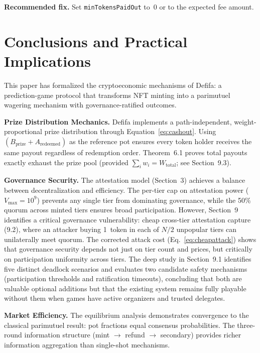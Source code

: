 \documentclass[11pt,a4paper]{article}
\begin{document}
\textbf{Recommended fix.} Set \texttt{minTokensPaidOut} to~0 or to the expected fee amount.

\section{Conclusions and Practical Implications}

This paper has formalized the cryptoeconomic mechanisms of Defifa: a prediction-game protocol that transforms NFT minting into a parimutuel wagering mechanism with governance-ratified outcomes.

\textbf{Prize Distribution Mechanics.} Defifa implements a path-independent, weight-proportional prize distribution through Equation~\ref{eq:cashout}. Using $(B_{\text{prize}} + A_{\text{redeemed}})$ as the reference pot ensures every token holder receives the same payout regardless of redemption order. Theorem~6.1 proves total payouts exactly exhaust the prize pool (provided $\sum_i w_i = W_{\text{total}}$; see Section~9.3).

\textbf{Governance Security.} The attestation model (Section~3) achieves a balance between decentralization and efficiency. The per-tier cap on attestation power ($V_{\text{max}} = 10^9$) prevents any single tier from dominating governance, while the 50\% quorum across minted tiers ensures broad participation. However, Section~9 identifies a critical governance vulnerability: cheap cross-tier attestation capture (9.2), where an attacker buying 1~token in each of $N/2$ unpopular tiers can unilaterally meet quorum. The corrected attack cost (Eq.~\ref{eq:cheapattack}) shows that governance security depends not just on tier count and prices, but critically on participation uniformity across tiers. The deep study in Section~9.1 identifies five distinct deadlock scenarios and evaluates two candidate safety mechanisms (participation thresholds and ratification timeouts), concluding that both are valuable optional additions but that the existing system remains fully playable without them when games have active organizers and trusted delegates.

\textbf{Market Efficiency.} The equilibrium analysis demonstrates convergence to the classical parimutuel result: pot fractions equal consensus probabilities. The three-round information structure (mint $\to$ refund $\to$ secondary) provides richer information aggregation than single-shot mechanisms.
\end{document}

